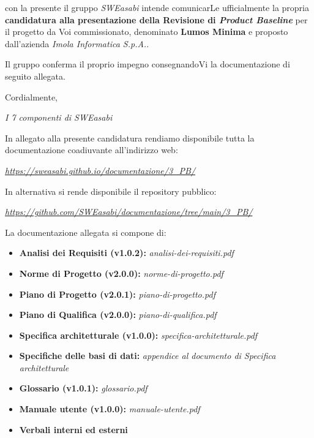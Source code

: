 \documentclass{article}
\begin{document}
con la presente il gruppo \textit{SWEasabi} intende comunicarLe ufficialmente la propria \textbf{candidatura alla presentazione della Revisione di \textit{Product Baseline}} per il progetto da Voi commissionato, denominato \textbf{Lumos Minima} e proposto dall'azienda \textit{Imola Informatica S.p.A.}.

Il gruppo conferma il proprio impegno consegnandoVi la documentazione di seguito allegata.

Cordialmente,

\begin{flushright}
\textit{I 7 componenti di SWEasabi}
\end{flushright}

In allegato alla presente candidatura rendiamo disponibile tutta la documentazione coadiuvante all'indirizzo web:

\begin{center}
    \href{https://sweasabi.github.io/documentazione/3\_PB/}{\textit{https://sweasabi.github.io/documentazione/3\_PB/}}
\end{center}

In alternativa si rende disponibile il repository pubblico:

\begin{center}
    \href{https://github.com/SWEasabi/documentazione/tree/main/3\_PB/}{\textit{https://github.com/SWEasabi/documentazione/tree/main/3\_PB/}}

\end{center}

La documentazione allegata si compone di:
\begin{itemize}
    \item \textbf{Analisi dei Requisiti (v1.0.2):} \textit{analisi-dei-requisiti.pdf}
    \item \textbf{Norme di Progetto (v2.0.0):} \textit{norme-di-progetto.pdf}
    \item \textbf{Piano di Progetto (v2.0.1):} \textit{piano-di-progetto.pdf}
    \item \textbf{Piano di Qualifica (v2.0.0):} \textit{piano-di-qualifica.pdf}
    \item \textbf{Specifica architetturale (v1.0.0):} \textit{specifica-architetturale.pdf}
    \item \textbf{Specifiche delle basi di dati:} \textit{appendice al documento di Specifica architetturale}
    \item \textbf{Glossario (v1.0.1):} \textit{glossario.pdf}
    \item \textbf{Manuale utente (v1.0.0):} \textit{manuale-utente.pdf}
    \item \textbf{Verbali interni ed esterni}
\end{itemize}
\end{document}
